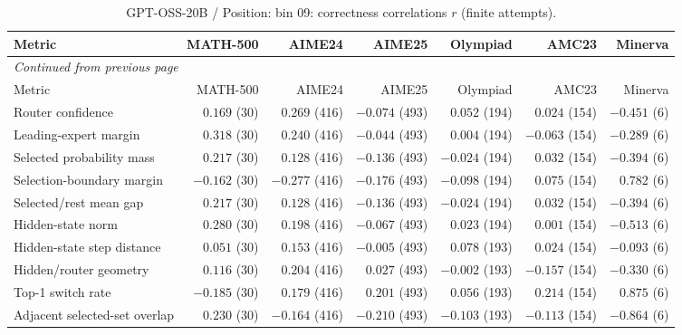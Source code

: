 \begingroup\scriptsize\setlength{\tabcolsep}{4pt}
\begin{longtable}{@{}lrrrrrr@{}}
\caption{GPT-OSS-20B / Position: bin 09: correctness correlations $r$ (finite attempts).}\label{tab:multi-gptoss-position-bin_09}\\
\toprule
Metric & MATH-500 & AIME24 & AIME25 & Olympiad & AMC23 & Minerva \\
\midrule\endfirsthead
\multicolumn{7}{l}{\textit{Continued from previous page}}\\
\toprule
Metric & MATH-500 & AIME24 & AIME25 & Olympiad & AMC23 & Minerva \\
\midrule\endhead
\bottomrule\endfoot
Router confidence & $0.169$ (30) & $0.269$ (416) & $-0.074$ (493) & $0.052$ (194) & $0.024$ (154) & $-0.451$ (6) \\
Leading-expert margin & $0.318$ (30) & $0.240$ (416) & $-0.044$ (493) & $0.004$ (194) & $-0.063$ (154) & $-0.289$ (6) \\
Selected probability mass & $0.217$ (30) & $0.128$ (416) & $-0.136$ (493) & $-0.024$ (194) & $0.032$ (154) & $-0.394$ (6) \\
Selection-boundary margin & $-0.162$ (30) & $-0.277$ (416) & $-0.176$ (493) & $-0.098$ (194) & $0.075$ (154) & $0.782$ (6) \\
Selected/rest mean gap & $0.217$ (30) & $0.128$ (416) & $-0.136$ (493) & $-0.024$ (194) & $0.032$ (154) & $-0.394$ (6) \\
Hidden-state norm & $0.280$ (30) & $0.198$ (416) & $-0.067$ (493) & $0.023$ (194) & $0.001$ (154) & $-0.513$ (6) \\
Hidden-state step distance & $0.051$ (30) & $0.153$ (416) & $-0.005$ (493) & $0.078$ (193) & $0.024$ (154) & $-0.093$ (6) \\
Hidden/router geometry & $0.116$ (30) & $0.204$ (416) & $0.027$ (493) & $-0.002$ (193) & $-0.157$ (154) & $-0.330$ (6) \\
Top-1 switch rate & $-0.185$ (30) & $0.179$ (416) & $0.201$ (493) & $0.056$ (193) & $0.214$ (154) & $0.875$ (6) \\
Adjacent selected-set overlap & $0.230$ (30) & $-0.164$ (416) & $-0.210$ (493) & $-0.103$ (193) & $-0.113$ (154) & $-0.864$ (6) \\
\end{longtable}\endgroup

